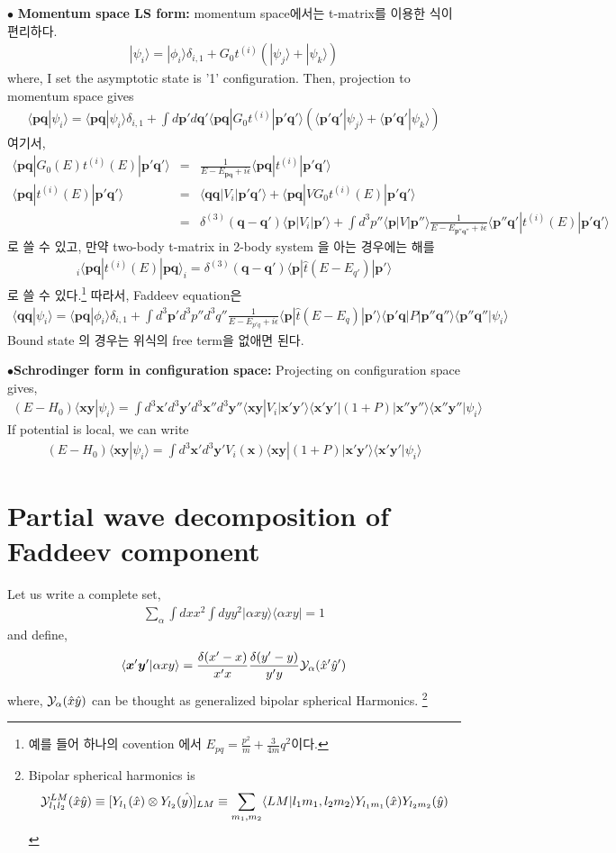 \documentclass[11pt]{article}
\def\bm{\boldsymbol}
\newcommand{\bea}{\begin{eqnarray}}
\newcommand{\eea}{\end{eqnarray}}
\newcommand{\no}{\nonumber \\}
\newcommand{\vp}{{\bm p}}
\newcommand{\vq}{{\bm q}}
\newcommand{\vx}{{\bm x}}
\newcommand{\vy}{{\bm y}}
\newcommand{\la}{\langle}
\newcommand{\ra}{\rangle}
\begin{document}
$\bullet$ {\bf Momentum space LS form:} 
momentum space에서는 t-matrix를 이용한 식이 편리하다.
\bea
|\psi_i\ra=|\phi_i\ra\delta_{i,1}+G_0 t^{(i)}
           ( |\psi_j\ra+|\psi_k\ra)
\eea
where, I set the asymptotic state is '1' configuration.
Then, projection to momentum space gives
\bea
\la \vp\vq|\psi_i\ra=\la \vp \vq|\psi_i\ra\delta_{i,1}
       +\int d\vp' d\vq' \la \vp\vq| G_0 t^{(i)}|\vp'\vq'\ra
        (\la \vp'\vq'|\psi_j\ra+\la\vp'\vq'|\psi_k\ra)     
\eea
여기서, 
\bea
\la \vp\vq|G_0(E) t^{(i)}(E)|\vp'\vq'\ra
&=&\frac{1}{E-E_{\vp\vq}+i\epsilon}
   \la \vp\vq|t^{(i)}|\vp'\vq'\ra \no
\la \vp\vq|t^{(i)}(E)|\vp'\vq'\ra
&=&\la \vq\vq|V_i|\vp'\vq'\ra
  +\la \vp\vq|V G_0 t^{(i)}(E)|\vp'\vq'\ra\no
&=&\delta^{(3)}(\vq-\vq')\la \vp|V_i|\vp'\ra
   +\int d^3 p''\la \vp|V|\vp''\ra
    \frac{1}{E-E_{\vp''\vq''}+i\epsilon}
     \la \vp'' \vq'|t^{(i)}(E)|\vp'\vq'\ra  
\eea
로 쓸 수 있고, 만약 two-body t-matrix in 2-body system 을 아는 경우에는
해를
\bea
{}_i\la \vp \vq|t^{(i)}(E)|\vp\vq\ra_i=\delta^{(3)}(\vq-\vq')
                                 \la \vp|\hat{t}(E-E_{q'})|\vp'\ra
\eea
로 쓸 수 있다.\footnote{예를 들어 하나의 covention 에서 $E_{pq}=\frac{p^2}{m}+\frac{3}{4m}q^2$이다.}
따라서, Faddeev equation은 
\bea
\la \vq\vq|\psi_i\ra=\la\vp\vq|\phi_i\ra\delta_{i,1}
   +\int d^3\vp' d^3 p'' d^3 q''
    \frac{1}{E-E_{p'q}+i\epsilon}\la \vp|\hat{t}(E-E_{q})|\vp'\ra
          \la \vp'\vq|P|\vp''\vq''\ra\la\vp''\vq''|\psi_i\ra                        
\eea
Bound state 의 경우는 위식의 free term을 없애면 된다.

$\bullet${\bf Schrodinger form in configuration space:}
Projecting on configuration space gives, 
\bea
(E-H_0)\la \vx\vy|\psi_i\ra=
\int d^3 \vx' d^3 \vy' d^3 \vx'' d^3 \vy''
\la \vx\vy|V_i|\vx'\vy'\ra
                            \la \vx'\vy'|(1+P)|\vx''\vy''\ra
                            \la \vx''\vy''|\psi_i\ra
\eea
If potential is local, we can write 
\bea
(E-H_0)\la \vx\vy|\psi_i\ra=
\int d^3 \vx' d^3 \vy' V_i(\vx)
                      \la \vx\vy|(1+P)|\vx'\vy'\ra
                      \la \vx'\vy'|\psi_i\ra
\eea

\section{Partial wave decomposition of Faddeev component}

Let us write a complete set,
\bea
\sum_\alpha \int dx x^2 \int dy y^2 |\alpha x y\ra\la \alpha x y|=1
\eea
and define,
\bea
\la \vx'\vy'|\alpha x y\ra
=\frac{\delta(x'-x)}{x'x}\frac{\delta(y'-y)}{y'y}
 {\cal Y}_{\alpha}(\hat{x}'\hat{y}')
\eea
where, ${\cal Y}_\alpha(\hat{x}\hat{y})$ can be thought as
generalized bipolar spherical Harmonics.
\footnote{
Bipolar spherical harmonics is
\bea
{\cal Y}_{l_1 l_2}^{LM}(\hat{x}\hat{y})\equiv[Y_{l_1}(\hat{x})\otimes Y_{l_2}(\hat{y)}]_{LM}
\equiv\sum_{m_1,m_2}\la L M|l_1 m_1,l_2 m_2\ra 
  Y_{l_1m_1}(\hat{x})Y_{l_2m_2}(\hat{y})
\eea
} 
\end{document}
